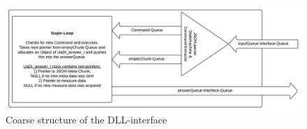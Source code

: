 \documentclass[]{scrreprt}
\begin{document}
\begin{figure}
    \includegraphics[width=.9\textwidth]{./assets/pictures/interface.pdf}
    \caption[]{Coarse structure of the DLL-interface}
    \label{fig:dllinterface}
\end{figure}











\end{document}
